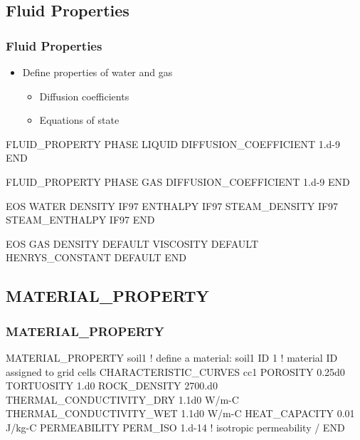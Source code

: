 \documentclass{beamer}
\newcommand\bluecomment[1]{{{\color{blue} #1}}}
\newcommand\greencomment[1]{{{\color{green} #1}}}
\begin{document}
\subsection{Fluid Properties}

\begin{frame}\frametitle{Fluid Properties}

\begin{itemize}
  \item Define properties of water and gas
  \begin{itemize}
    \item Diffusion coefficients
    \item Equations of state
  \end{itemize}
\end{itemize}

\begin{semiverbatim}
FLUID_PROPERTY
  PHASE LIQUID
  DIFFUSION_COEFFICIENT 1.d-9
END

FLUID_PROPERTY
  PHASE GAS
  DIFFUSION_COEFFICIENT 1.d-9
END

\newpage

EOS WATER
  DENSITY IF97
  ENTHALPY IF97
  STEAM_DENSITY IF97
  STEAM_ENTHALPY IF97
END

EOS GAS
  DENSITY DEFAULT
  VISCOSITY DEFAULT
  HENRYS_CONSTANT DEFAULT
END

\end{semiverbatim}

\end{frame}

\subsection{MATERIAL\_PROPERTY}

\begin{frame}\frametitle{MATERIAL\_PROPERTY}

\begin{semiverbatim}
MATERIAL_PROPERTY soil1  \bluecomment{! define a material:} \greencomment{soil1}
  ID 1             \bluecomment{! material ID assigned to grid cells}
  CHARACTERISTIC\_CURVES cc1
  POROSITY 0.25d0
  TORTUOSITY 1.d0
  ROCK_DENSITY 2700.d0
  THERMAL_CONDUCTIVITY_DRY 1.1d0 W/m-C
  THERMAL_CONDUCTIVITY_WET 1.1d0 W/m-C
  HEAT_CAPACITY 0.01 J/kg-C
  PERMEABILITY     
    PERM_ISO 1.d-14  \bluecomment{! isotropic permeability}
  /
END
\end{semiverbatim}

\end{frame}
\end{document}

